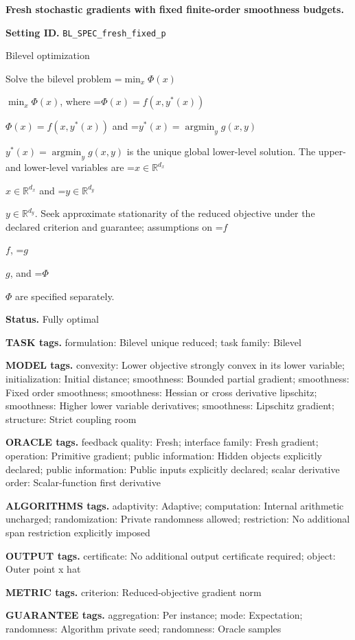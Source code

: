 \documentclass[10pt,a4paper]{article}
\newcommand{\AtlasMath}[1]{\par\begingroup\centering\setbox0=\hbox{$\displaystyle #1$}\ifdim\wd0>1.4\linewidth\typeout{ATLAS WIDE FORMULA: \the\wd0}\fi\ifdim\wd0>\linewidth\resizebox{\linewidth}{!}{\box0}\else\box0\fi\par\endgroup}
\newcommand{\AtlasInlineMath}[1]{\begingroup\setbox0=\hbox{$#1$}\ifdim\wd0>.4\linewidth\endgroup\AtlasMath{#1}\else\endgroup$#1$\fi}
\begin{document}
\raggedright

{\LARGE\bfseries\sffamily\color{AtlasNavy} Fresh stochastic gradients with fixed finite-order smoothness budgets.\par}\vspace{5pt}
\textbf{Setting ID.} \texttt{BL\_\allowbreak{}SPEC\_\allowbreak{}fresh\_\allowbreak{}fixed\_\allowbreak{}p}

Bilevel optimization

Solve the bilevel problem \AtlasInlineMath{\min_x\Phi(x)}, where \AtlasInlineMath{\Phi(x)=f(x,y^*(x))} and \AtlasInlineMath{y^*(x)=\operatorname*{argmin}_y g(x,y)} is the unique global lower-level solution. The upper- and lower-level variables are \AtlasInlineMath{x\in\mathbb{R}^{d_x}} and \AtlasInlineMath{y\in\mathbb{R}^{d_y}}. Seek approximate stationarity of the reduced objective under the declared criterion and guarantee; assumptions on \AtlasInlineMath{f}, \AtlasInlineMath{g}, and \AtlasInlineMath{\Phi} are specified separately.

\textbf{Status.} Fully optimal

\textbf{TASK tags.} formulation: Bilevel unique reduced; task family: Bilevel

\textbf{MODEL tags.} convexity: Lower objective strongly convex in its lower variable; initialization: Initial distance; smoothness: Bounded partial gradient; smoothness: Fixed order smoothness; smoothness: Hessian or cross derivative lipschitz; smoothness: Higher lower variable derivatives; smoothness: Lipschitz gradient; structure: Strict coupling room

\textbf{ORACLE tags.} feedback quality: Fresh; interface family: Fresh gradient; operation: Primitive gradient; public information: Hidden objects explicitly declared; public information: Public inputs explicitly declared; scalar derivative order: Scalar-function first derivative

\textbf{ALGORITHMS tags.} adaptivity: Adaptive; computation: Internal arithmetic uncharged; randomization: Private randomness allowed; restriction: No additional span restriction explicitly imposed

\textbf{OUTPUT tags.} certificate: No additional output certificate required; object: Outer point x hat

\textbf{METRIC tags.} criterion: Reduced-objective gradient norm

\textbf{GUARANTEE tags.} aggregation: Per instance; mode: Expectation; randomness: Algorithm private seed; randomness: Oracle samples
\end{document}
